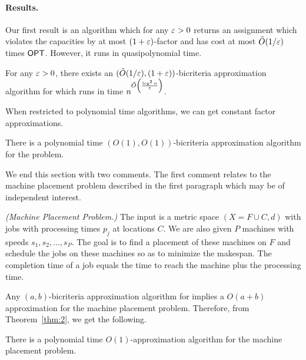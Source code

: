 \paragraph{Results.}
Our first result is an algorithm which for any $\varepsilon>0$ returns an assignment which violates the capacities by at most $(1+\varepsilon)$-factor and has cost at most $\tilde{O}(1/\varepsilon)$ times $\mathsf{OPT}$. However, it runs in quasipolynomial time.
\begin{theorem}\label{thm:1}
	For any $\varepsilon > 0$, there exists an $(\tilde{O}(1/\varepsilon), (1+\varepsilon))$-bicriteria approximation algorithm for \mckc which runs in time $n^{\tilde{O}\left(\frac{\log^2 n}{\varepsilon}\right)}$.
\end{theorem}
When restricted to polynomial time algorithms, we can get constant factor approximations.
\begin{theorem}\label{thm:2}
	There is a polynomial time  $(O(1),O(1))$-bicriteria approximation algorithm for the \mckc problem.
\end{theorem}
%
%
We end this section with two comments. 
The first comment relates to the machine placement problem described in the first paragraph which may be of independent interest. 
\begin{definition}\emph{(Machine Placement Problem.)}
The input is a metric space $(X=F\cup C,d)$ with jobs with processing times $p_j$ at locations $C$. We are also given $P$ machines with speeds $s_1,s_2,\ldots,s_P$.
The goal is to find a placement of these machines on $F$ and schedule the jobs on these machines so as to minimize the makespan. The completion time of a job equals the time to reach the machine plus the processing time.
\end{definition}
Any $(a,b)$-bicriteria approximation algorithm for \mckc implies a $O(a+b)$ approximation for the machine placement problem. Therefore, from Theorem~\ref{thm:2}, we get the following.
\begin{theorem}\label{thm:mpp}
There is a polynomial time $O(1)$-approximation algorithm for the machine placement problem.
\end{theorem}
